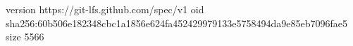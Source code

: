 version https://git-lfs.github.com/spec/v1
oid sha256:60b506e182348cbc1a1856e624fa452429979133e5758494da9e85eb7096fae5
size 5566
